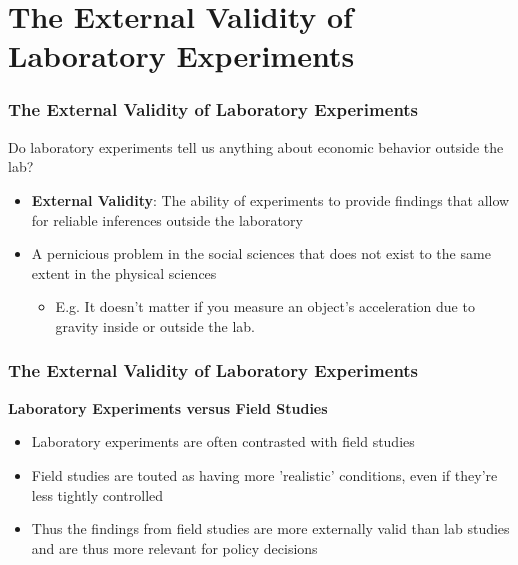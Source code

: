 \documentclass{beamer}
\begin{document}
\section{The External Validity of Laboratory Experiments}


\begin{frame}
	\frametitle{The External Validity of Laboratory Experiments}
	
	Do laboratory experiments tell us anything about economic behavior outside the lab? 
	
	\begin{itemize}
		\item \textbf{External Validity}: The ability of experiments to provide findings that allow for reliable inferences outside the laboratory
		\item A pernicious problem in the social sciences that does not exist to the same extent in the physical sciences
		\begin{itemize}
			\item E.g. It doesn't matter if you measure an object's acceleration due to gravity inside or outside the lab.
		\end{itemize}
	\end{itemize}
\end{frame}

\begin{frame}
	\frametitle{The External Validity of Laboratory Experiments}
	\textbf{Laboratory Experiments versus Field Studies}
	\begin{itemize}
		\item Laboratory experiments are often contrasted with field studies
		\item Field studies are touted as having more 'realistic' conditions, even if they're less tightly controlled
		\item Thus the findings from field studies are more externally valid than lab studies and are thus more relevant for policy decisions
	\end{itemize}

\end{frame}
\end{document}
